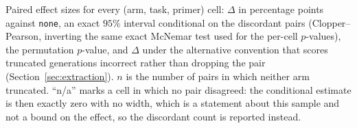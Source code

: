 Paired effect sizes for every (arm, task, primer) cell: $\Delta$ in
percentage points against \texttt{none}, an exact $95\%$ interval
conditional on the discordant pairs (Clopper--Pearson, inverting the
same exact McNemar test used for the per-cell $p$-values), the
permutation $p$-value, and $\Delta$ under the alternative
convention that scores truncated generations incorrect rather than
dropping the pair (Section~\ref{sec:extraction}). $n$ is the
number of pairs in which neither arm truncated. ``n/a'' marks a cell
in which no pair disagreed: the conditional estimate is then exactly
zero with no width, which is a statement about this sample and not a
bound on the effect, so the discordant count is reported instead.

\begin{table}[H]
\centering\footnotesize
\setlength{\tabcolsep}{3pt}
\end{table}
